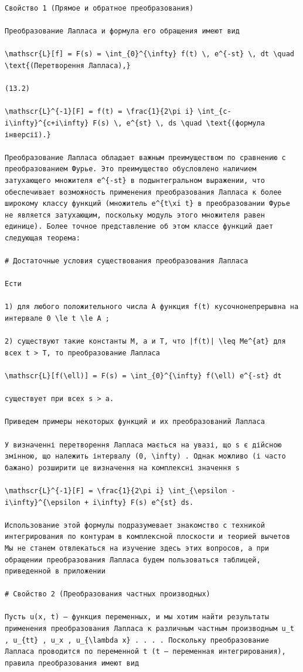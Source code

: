 \documentclass[
  ukrainian,
]{article}
\begin{document}
\begin{verbatim}
Свойство 1 (Прямое и обратное преобразования)

Преобразование Лапласа и формула его обращения имеют вид

\mathscr{L}[f] = F(s) = \int_{0}^{\infty} f(t) \, e^{-st} \, dt \quad \text{(Перетворення Лапласа),}

(13.2)

\mathscr{L}^{-1}[F] = f(t) = \frac{1}{2\pi i} \int_{c-i\infty}^{c+i\infty} F(s) \, e^{st} \, ds \quad \text{(формула інверсії).}

Преобразование Лапласа обладает важным преимуществом по сравнению с преобразованием Фурье. Это преимущество обусловлено наличием затухающего множителя e^{-st} в подынтегральном выражении, что обеспечивает возможность применения преобразования Лапласа к более широкому классу функций (множитель e^{t\xi t} в преобразовании Фурье не является затухающим, поскольку модуль этого множителя равен единице). Более точное представление об этом классе функций дает следующая теорема:

# Достаточные условия существования преобразования Лапласа

Ести

1) для любого положительного числа A функция f(t) кусочнонепрерывна на интервале 0 \le t \le A ;

2) существуют такие константы M, a и T, что |f(t)| \leq Me^{at} для всех t > T, то преобразование Лапласа

\mathscr{L}[f(\ell)] = F(s) = \int_{0}^{\infty} f(\ell) e^{-st} dt

существует при всех s > a.

Приведем примеры некоторых функций и их преобразований Лапласа

У визначенні перетворення Лапласа мається на увазі, що s є дійсною змінною, що належить інтервалу (0, \infty) . Однак можливо (і часто бажано) розширити це визначення на комплексні значення s

\mathscr{L}^{-1}[F] = \frac{1}{2\pi i} \int_{\epsilon - i\infty}^{\epsilon + i\infty} F(s) e^{st} ds.

Использование этой формулы подразумевает знакомство с техникой интегрирования по контурам в комплексной плоскости и теорией вычетов Мы не станем отвлекаться на изучение здесь этих вопросов, а при обращении преобразования Лапласа будем пользоваться таблицей, приведенной в приложении

# Свойство 2 (Преобразования частных производных)

Пусть u(x, t) — функция переменных, и мы хотим найти результаты применения преобразования Лапласа к различным частным производным u_t , u_{tt} , u_x , u_{\lambda x} . . . . Поскольку преобразование Лапласа проводится по переменной t (t — переменная интегрирования), правила преобразования имеют вид


\end{verbatim}
\end{document}
